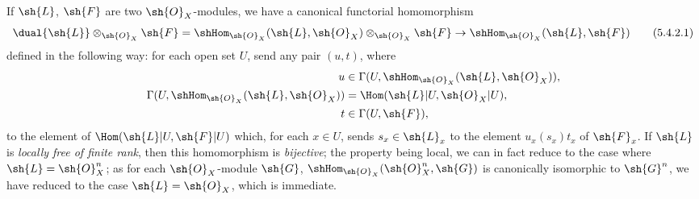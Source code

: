\begin{env}[5.4.2]
\label{0.5.4.2}
If $\sh{L}$, $\sh{F}$ are two $\sh{O}_X$-modules, we have a canonical functorial homomorphism
\[
  \dual{\sh{L}}\otimes_{\sh{O}_X}\sh{F}=\shHom_{\sh{O}_X}(\sh{L},\sh{O}_X)\otimes_{\sh{O}_X}\sh{F}\to\shHom_{\sh{O}_X}(\sh{L},\sh{F})
  \tag{5.4.2.1}
  \label{0.5.4.2.1}
\]
defined in the following way:
for each open set $U$, send any pair $(u,t)$, where
\[
  \begin{aligned}
  u&\in\Gamma(U,\shHom_{\sh{O}_X}(\sh{L},\sh{O}_X)),\\
  \Gamma(U,\shHom_{\sh{O}_X}(\sh{L},\sh{O}_X))
    &=\Hom(\sh{L}|U,\sh{O}_X|U),\\
  t&\in\Gamma(U,\sh{F}),
  \end{aligned}
\]
to the element of $\Hom(\sh{L}|U,\sh{F}|U)$ which, for each $x\in U$, sends $s_x\in\sh{L}_x$ to the element $u_x(s_x)t_x$ of $\sh{F}_x$.
If $\sh{L}$ is \emph{locally free of finite rank}, then this homomorphism is \emph{bijective};
the property being local, we can in fact reduce to the case where $\sh{L}=\sh{O}_X^n$;
as for each $\sh{O}_X$-module $\sh{G}$, $\shHom_{\sh{O}_X}(\sh{O}_X^n,\sh{G})$ is canonically isomorphic to $\sh{G}^n$, we have reduced to the case $\sh{L}=\sh{O}_X$, which is immediate.
\end{env}

